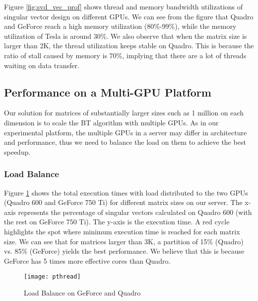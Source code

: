Figure \ref{fig:svd_vec_prof} shows thread and memory bandwidth utilizations of singular vector design on different GPUs. 
We can see from the figure that Quadro and GeForce reach a high memory utilization (80\%-99\%), while the memory utilization of Tesla is around 30\%. 
We also observe that when the matrix size is larger than 2K, the thread utilization keeps stable on Quadro. 
This is because the ratio of stall caused by memory is 70\%, implying that there are a lot of threads waiting on data transfer.


\subsection{Performance on a Multi-GPU Platform}

Our solution for matrices of substantially larger sizes such
as 1 million on each dimension is to scale the BT algorithm
with multiple GPUs.
As in our experimental platform, the multiple GPUs in a server may differ
in architecture and performance, thus we need to balance the load on them
to achieve the best speedup.

\subsubsection{Load Balance}
Figure \ref{fig:pthread} shows the total execution times with load distributed to the two GPUs
(Quadro 600 and GeForce 750 Ti) for different matrix sizes on our server.
The x-axis represents the percentage of singular vectors calculated on Quadro 600 (with the rest on GeForce 750 Ti).
The y-axis is the execution time.
A red cycle
highlights the spot where minimum execution time is reached
for each matrix size. We can see that for matrices larger than
3K, a partition of 15\% (Quadro) vs. 85\% (GeForce) yields the
best performance. We believe that this is because 
GeForce has 5 times more effective cores than Quadro.
\begin{figure}[hbpt]
\centering
\texttt{[image: pthread]}
\caption{Load Balance on GeForce and Quadro}
\label{fig:pthread}
\vspace{-0.15in}
\end{figure}
\fi

